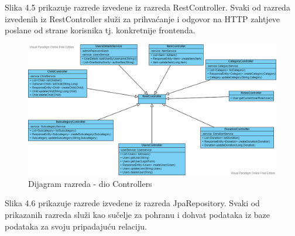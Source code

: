 			\eject

			Slika 4.5 prikazuje razrede izvedene iz razreda RestController. Svaki od razreda izvedenih iz RestController služi za prihvaćanje i odgovor na HTTP zahtjeve poslane od strane korisnika tj. konkretnije frontenda.\\[10pt]

			\begin{figure}[H]
				\includegraphics[width=\textwidth,height=0.4\textheight]{dijagrami/Controlleri.png}
				\centering
				\caption{Dijagram razreda - dio Controllers}
				\label{fig:Controllers}
			\end{figure}

			\eject

			Slika 4.6 prikazuje razrede izvedene iz razreda JpaRepository. Svaki od prikazanih razreda služi kao sučelje za pohranu i dohvat podataka iz baze podataka za svoju pripadajuću relaciju.\\[10pt]


